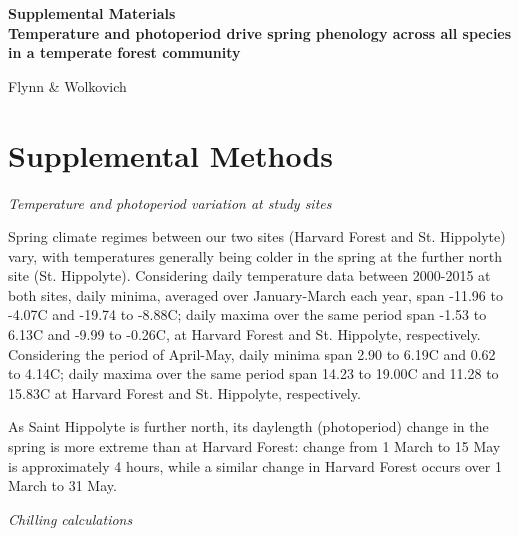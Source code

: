 \documentclass{article}
\begin{document}

\begin{center}
\textbf{\Large{Supplemental Materials \vspace{1ex}\\Temperature and photoperiod drive spring phenology across all species in a temperate forest community}}

Flynn \& Wolkovich
\end{center}

\renewcommand{\thetable}{S\arabic{table}}
\renewcommand{\thefigure}{S\arabic{figure}}

\section*{Supplemental Methods}

\noindent\emph{Temperature and photoperiod variation at study sites}

\noindent Spring climate regimes between our two sites (Harvard Forest and St. Hippolyte) vary, with temperatures generally being colder in the spring at the further north site (St. Hippolyte). Considering daily temperature data between 2000-2015 at both sites, daily minima, averaged over January-March each year, span -11.96 to -4.07\degree C and -19.74 to -8.88\degree C; daily maxima over the same period span -1.53 to 6.13\degree C and -9.99 to -0.26\degree C, at Harvard Forest and St. Hippolyte, respectively. Considering the period of April-May, daily minima span 2.90 to 6.19\degree C and 0.62 to 4.14\degree C; daily maxima over the same period span 14.23 to 19.00\degree C and 11.28 to 15.83\degree C at Harvard Forest and St. Hippolyte, respectively. 

\noindent As Saint Hippolyte is further north, its daylength (photoperiod) change in the spring is more extreme than at Harvard Forest: change from 1 March to 15 May is approximately 4 hours, while a similar change in Harvard Forest occurs over 1 March to 31 May. 

\noindent\emph{Chilling calculations}
\end{document}

